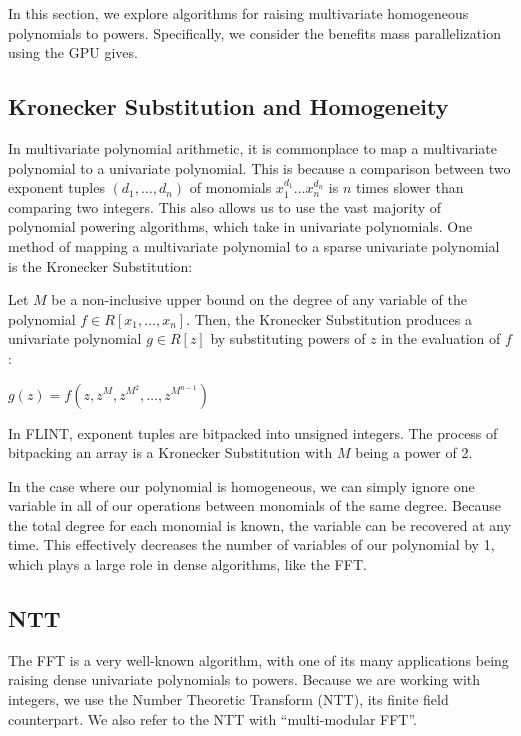 In this section, we explore algorithms for raising multivariate homogeneous polynomials to powers. Specifically, we consider the benefits mass parallelization using the GPU gives.

\subsection{Kronecker Substitution and Homogeneity}
In multivariate polynomial arithmetic, it is commonplace to map a multivariate polynomial to a univariate 
polynomial. This is because a comparison between two exponent tuples $(d_1, \dots , d_n)$ of monomials 
$x_1^{d_1} \dots x_n^{d_n}$ is $n$ times slower than comparing two integers. This also allows us to use the vast majority of polynomial powering algorithms, which take in univariate polynomials. One method of mapping a multivariate polynomial to a sparse univariate polynomial is the Kronecker Substitution:

\begin{defn}
    Let $M$ be a non-inclusive upper bound on the degree of any variable of the polynomial
    $f \in R[x_1, \dots, x_n]$. Then, the Kronecker Substitution \cite{arnold-2014-kronecker} produces a univariate polynomial $g \in R[z]$ by substituting powers of $z$ in 
    the evaluation of $f$: 

    \begin{center}
        $g(z) = f(z, z^M, z^{M^2}, \dots, z^{M^{n-1}})$
    \end{center}
\end{defn}

\begin{rmk}
    In FLINT, exponent tuples are bitpacked into unsigned integers. The process of bitpacking an array is a Kronecker Substitution with $M$ being a power of 2.
\end{rmk}

In the case where our polynomial is homogeneous, we can simply ignore one variable in all of our operations between monomials of the same degree. Because the total degree for each monomial is known, the variable can be recovered at any time. This effectively decreases the number of variables of our polynomial by 1, which plays a large role in dense algorithms, like the FFT.

\subsection{NTT}
The FFT is a very well-known algorithm, with one of its many applications being raising dense univariate polynomials to powers.
Because we are working with integers, we use the Number Theoretic Transform (NTT), its finite field counterpart. We also refer to the NTT with ``multi-modular FFT''.

